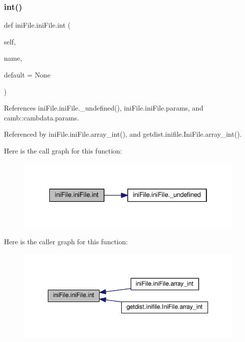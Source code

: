 \subsubsection{\texorpdfstring{int()}{int()}}
{\footnotesize\ttfamily def ini\+File.\+ini\+File.\+int (\begin{DoxyParamCaption}\item[{}]{self,  }\item[{}]{name,  }\item[{}]{default = {\ttfamily None} }\end{DoxyParamCaption})}



References ini\+File.\+ini\+File.\+\_\+undefined(), ini\+File.\+ini\+File.\+params, and camb\+::cambdata.\+params.



Referenced by ini\+File.\+ini\+File.\+array\+\_\+int(), and getdist.\+inifile.\+Ini\+File.\+array\+\_\+int().

Here is the call graph for this function\+:
\nopagebreak
\begin{figure}[H]
\begin{center}
\leavevmode
\includegraphics[width=322pt]{classiniFile_1_1iniFile_ade7c382459479ea30036a227764b834f_cgraph}
\end{center}
\end{figure}
Here is the caller graph for this function\+:
\nopagebreak
\begin{figure}[H]
\begin{center}
\leavevmode
\includegraphics[width=342pt]{classiniFile_1_1iniFile_ade7c382459479ea30036a227764b834f_icgraph}
\end{center}
\end{figure}
\mbox{\label{classiniFile_1_1iniFile_ae8d224f441caa05fe9ecad65bf2ed489}} 
